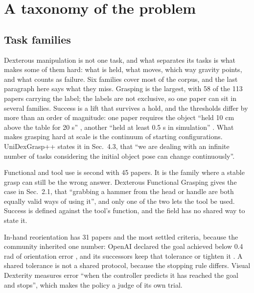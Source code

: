 \section{A taxonomy of the problem}
\label{sec:taxonomy}

\subsection{Task families}
\label{sec:taxonomy:tasks}

Dexterous manipulation is not one task, and what separates its tasks is what makes some of them
hard: what is held, what moves, which way gravity points, and what counts as failure. Six
families cover most of the corpus, and the last paragraph here says what they miss. Grasping is
the largest, with 58 of the 113 papers carrying the label; the labels are not exclusive, so one
paper can sit in several families. Success is a lift that survives a hold, and the thresholds
differ by more than an order of magnitude: one paper requires the object ``held 10 cm above the
table for 20 s'' \cite{dexgraspvla_2025}, another ``held at least 0.5 s in simulation''
\cite{omnigrasp_2024}. What makes grasping hard at scale is the continuum of starting
configurations. UniDexGrasp++
\cite{unidexgrasp_pp_2023} states it in Sec.~4.3, that ``we are dealing with an infinite number
of tasks considering the initial object pose can change continuously''.

Functional and tool use is second with 45 papers. It is the family where a stable grasp can
still be the wrong answer. Dexterous Functional Grasping
\cite{dexterous_functional_grasping_2023} gives the case in Sec.~2.1, that ``grabbing a hammer
from the head or handle are both equally valid ways of using it'', and only one of the two lets
the tool be used. Success is defined against the tool's function, and the field has no shared
way to state it.

In-hand reorientation has 31 papers and the most settled criteria, because the community
inherited one number: OpenAI declared the goal achieved below 0.4 rad of orientation error
\cite{openai_dexterity_2018}, and its successors keep that tolerance or tighten it
\cite{dextreme_2022,eureka_2023}. A shared tolerance is not a shared protocol, because the stopping
rule differs. Visual Dexterity \cite{visual_dexterity_2022} measures error ``when the controller
predicts it has reached the goal and stops'', which makes the policy a judge of its own trial.


